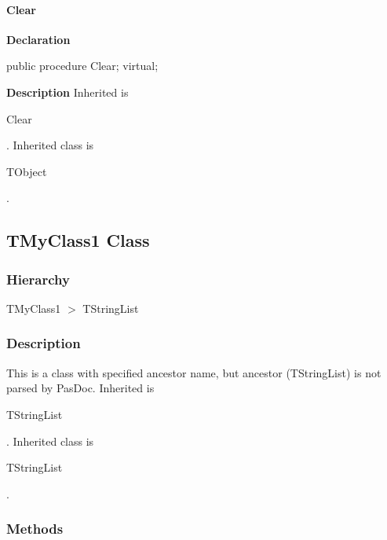 \documentclass{report}
\newif\ifpdf
\begin{document}
\paragraph*{Clear}\hspace*{\fill}

\label{warning_inherited_test.TMyClass0-Clear}
\begin{list}{}{
\setlength{\itemindent}{0cm}
\setlength{\listparindent}{0cm}
\setlength{\leftmargin}{\evensidemargin}
\addtolength{\leftmargin}{\tmplength}
\settowidth{\labelsep}{X}
\addtolength{\leftmargin}{\labelsep}
\setlength{\labelwidth}{\tmplength}
}
\item[\textbf{Declaration}\hfill]
\ifpdf
\begin{flushleft}
\fi
\begin{ttfamily}
public procedure Clear; virtual;\end{ttfamily}

\ifpdf
\end{flushleft}
\fi

\par
\item[\textbf{Description}]
Inherited is \begin{ttfamily}Clear\end{ttfamily}. Inherited class is \begin{ttfamily}TObject\end{ttfamily}.

\end{list}
\ifpdf
\subsection*{\large{\textbf{TMyClass1 Class}}\normalsize\hspace{1ex}\hrulefill}
\else
\subsection*{TMyClass1 Class}
\fi
\label{warning_inherited_test.TMyClass1}
\subsubsection*{\large{\textbf{Hierarchy}}\normalsize\hspace{1ex}\hfill}
TMyClass1 {$>$} TStringList
\subsubsection*{\large{\textbf{Description}}\normalsize\hspace{1ex}\hfill}
This is a class with specified ancestor name, but ancestor (TStringList) is not parsed by PasDoc. Inherited is \begin{ttfamily}TStringList\end{ttfamily}. Inherited class is \begin{ttfamily}TStringList\end{ttfamily}.\subsubsection*{\large{\textbf{Methods}}\normalsize\hspace{1ex}\hfill}
\end{document}
